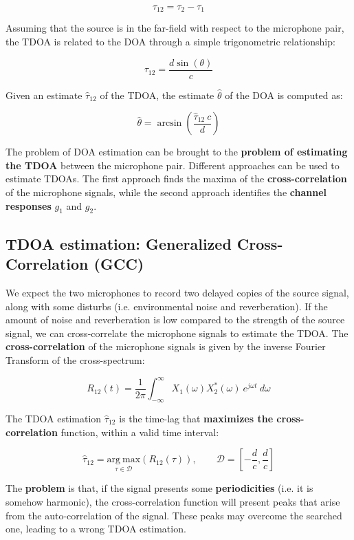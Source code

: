 \[
\tau_{12} = \tau_2 - \tau_1
\]

Assuming that the source is in the far-field with respect to the microphone pair, the TDOA is related to the DOA through a simple trigonometric relationship:

\[
\tau_{12} = \frac{d \sin \left( \theta \right)}{c}
\]

Given an estimate $\hat{\tau}_{12}$ of the TDOA, the estimate $\hat{\theta}$ of the DOA is computed as:

\[
\hat{\theta} = \arcsin \left( \frac{\hat{\tau}_{12} \ c}{d} \right)
\]


The problem of DOA estimation can be brought to the \textbf{problem of estimating the TDOA} between the microphone pair.
Different approaches can be used to estimate TDOAs.
The first approach finds the maxima of the \textbf{cross-correlation} of the microphone signals, while the second approach identifies the \textbf{channel responses} $g_{1}$ and $g_{2}$.

\subsection{TDOA estimation: Generalized Cross-Correlation (GCC)}
We expect the two microphones to record two delayed copies of the source signal, along with some disturbs (i.e. environmental noise and reverberation).
If the amount of noise and reverberation is low compared to the strength of the source signal, we can cross-correlate the microphone signals to estimate the TDOA.
The \textbf{cross-correlation} of the microphone signals is given by the inverse Fourier Transform of the cross-spectrum:

\[
R_{12}(t) = \frac{1}{2\pi} \int_{-\infty}^{\infty} X_{1}(\omega) X_{2}^{*}(\omega) \ e^{j\omega t} \ d\omega
\]

The TDOA estimation $\hat{\tau}_{12}$ is the time-lag that \textbf{maximizes the cross-correlation} function, within a valid time interval:

\[
\hat{\tau}_{12} =\underset{\tau \in \mathcal{D}}{\mathrm{arg \ max}} \left( R_{12}(\tau) \right), 
\qquad 
\mathcal{D} = \left[ -\frac{d}{c}, \frac{d}{c} \right]
\]

The \textbf{problem} is that, if the signal presents some \textbf{periodicities} (i.e. it is somehow harmonic), the cross-correlation function will present peaks that arise from the auto-correlation of the signal.
These peaks may overcome the searched one, leading to a wrong TDOA estimation.

